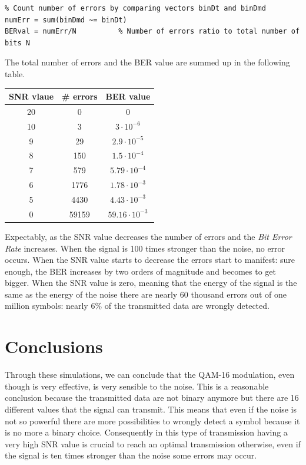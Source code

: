 \begin{lstlisting}
% Count number of errors by comparing vectors binDt and binDmd
numErr = sum(binDmd ~= binDt)
BERval = numErr/N          % Number of errors ratio to total number of bits N
\end{lstlisting}

\noindent The total number of errors and the BER value are summed up in the following table.

\begin{table}[h!]
    \centering
    \renewcommand{\arraystretch}{1.5}
    \begin{tabular}{|c|c c|}
        \hline
        \textbf{SNR vlaue} & \textbf{\# errors} & \textbf{BER value} \\\hline\hline
        20 & 0 & 0 \\\hline
        10 & 3 & $3\cdot10^{-6}$ \\\hline
        9 & 29 & $2.9\cdot10^{-5}$ \\\hline
        8 & 150 & $1.5\cdot10^{-4}$ \\\hline
        7 & 579 & $5.79\cdot10^{-4}$ \\\hline
        6 & 1776 & $1.78\cdot10^{-3}$ \\\hline
        5 & 4430 & $4.43\cdot10^{-3}$ \\\hline
        0 & 59159 & $59.16\cdot10^{-3}$ \\\hline
    \end{tabular}
    \renewcommand{\arraystretch}{1}
\end{table}

\noindent Expectably, as the SNR value decreases the number of errors and the \textsl{Bit Error Rate} increases. When the signal is 100 times stronger than the noise, no error occurs. When the SNR value starts to decrease the errors start to manifest: sure enough, the BER increases by two orders of magnitude and becomes to get bigger. When the SNR value is zero, meaning that the energy of the signal is the same as the energy of the noise there are nearly 60 thousand errors out of one million symbols: nearly 6\% of the transmitted data are wrongly detected.

\section*{Conclusions}
Through these simulations, we can conclude that the QAM-16 modulation, even though is very effective, is very sensible to the noise. This is a reasonable conclusion because the transmitted data are not binary anymore but there are 16 different values that the signal can transmit. This means that even if the noise is not so powerful there are more possibilities to wrongly detect a symbol because it is no more a binary choice. Consequently in this type of transmission having a very high SNR value is crucial to reach an optimal transmission otherwise, even if the signal is ten times stronger than the noise some errors may occur. 



